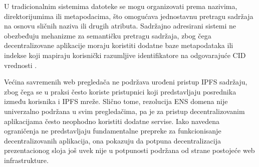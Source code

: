 U tradicionalnim sistemima datoteke se mogu organizovati prema nazivima, direktorijumima ili metapodacima, što omogućava jednostavnu pretragu sadržaja na osnovu sličnih naziva ili drugih atributa. Sadržajno adresirani sistemi ne obezbeđuju mehanizme za semantičku pretragu sadržaja, zbog čega decentralizovane aplikacije moraju koristiti dodatne baze metapodataka ili indekse koji mapiraju korisnički razumljive identifikatore na odgovarajuće CID vrednosti \cite{shevarev2025dynamic}.

Većina savremenih web pregledača ne podržava urođeni pristup IPFS sadržaju, zbog čega se u praksi često koriste pristupnici koji predstavljaju posrednika između korisnika i IPFS mreže. Slično tome, rezolucija ENS domena nije univerzalno podržana u svim pregledačima, pa je za pristup decentralizovanim aplikacijama često neophodno koristiti dodatne servise. Iako navedena ograničenja ne predstavljaju fundamentalne prepreke za funkcionisanje decentralizovanih aplikacija, ona pokazuju da potpuna decentralizacija prezentacionog sloja još uvek nije u potpunosti podržana od strane postojeće web infrastrukture.